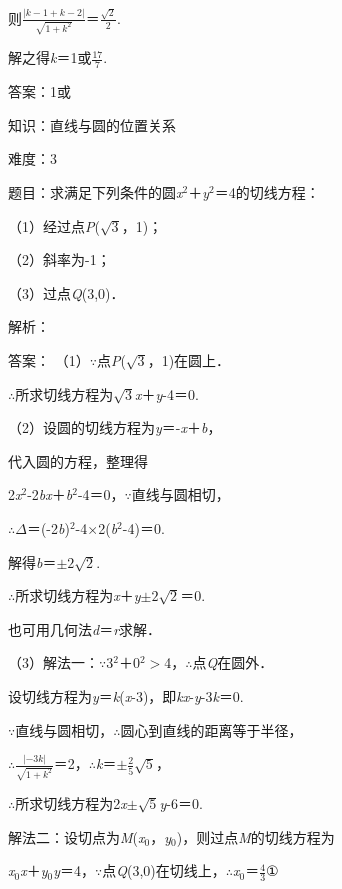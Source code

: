 \documentclass{article} %
\begin{document}
则$\frac{|k-1+k-2|}{\sqrt{1+k^2}}$＝$\frac{\sqrt{2}}{2}$.

解之得\textit{k}＝1或$\frac{17}{7}$.

答案：1或

知识：直线与圆的位置关系

难度：3

题目：求满足下列条件的圆\textit{x}${}^{2}$＋\textit{y}${}^{2}$＝4的切线方程：

（1）经过点\textit{P}($\sqrt{3}$，1)；

（2）斜率为-1；

（3）过点\textit{Q}(3,0)．

解析：

答案：
（1）$\mathrm{\because}$点\textit{P}($\sqrt{3}$，1)在圆上．

$\mathrm{\therefore}$所求切线方程为$\sqrt{3}$\textit{x}＋\textit{y}-4＝0.

（2）设圆的切线方程为\textit{y}＝-\textit{x}＋\textit{b}，

代入圆的方程，整理得

2\textit{x}${}^{2}$-2\textit{bx}＋\textit{b}${}^{2}$-4＝0，$\mathrm{\because}$直线与圆相切，

$\mathrm{\therefore}$$\Delta$＝(-2\textit{b})${}^{2}$-4$\mathrm{\times}$2(\textit{b}${}^{2}$-4)＝0.

解得\textit{b}＝$\mathrm{\pm}$$2\sqrt{2}$.

$\mathrm{\therefore}$所求切线方程为\textit{x}＋\textit{y}$\mathrm{\pm}$$2\sqrt{2}$＝0.

也可用几何法\textit{d}＝\textit{r}求解．

（3）解法一：$\mathrm{\because}$3${}^{2}$＋0${}^{2}$$\mathrm{>}$4，$\mathrm{\therefore}$点\textit{Q}在圆外．

设切线方程为\textit{y}＝\textit{k}(\textit{x}-3)，即\textit{kx}-\textit{y}-3\textit{k}＝0.

$\mathrm{\because}$直线与圆相切，$\mathrm{\therefore}$圆心到直线的距离等于半径，

$\mathrm{\therefore}$$\frac{|-3k|}{\sqrt{1+k^2}}$＝2，$\mathrm{\therefore}$\textit{k}＝$\mathrm{\pm}\frac{2}{5}\sqrt{5}$，

$\mathrm{\therefore}$所求切线方程为2\textit{x}$\mathrm{\pm}\sqrt{5}$\textit{y}-6＝0.

解法二：设切点为\textit{M}(\textit{x}${}_{0}$，\textit{y}${}_{0}$)，则过点\textit{M}的切线方程为

\textit{x}${}_{0}$\textit{x}＋\textit{y}${}_{0}$\textit{y}＝4，$\mathrm{\because}$点\textit{Q}(3,0)在切线上，$\mathrm{\therefore}$\textit{x}${}_{0}$＝$\frac{4}{3}$①
\end{document}
